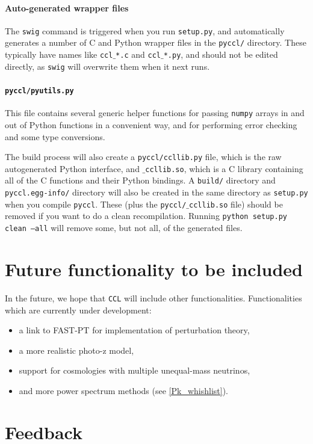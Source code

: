 \documentclass[\docopts]{\docclass}
\begin{document}
\paragraph{Auto-generated wrapper files} The {\tt swig} command is triggered when you run {\tt setup.py}, and automatically generates a number of C and Python wrapper files in the {\tt pyccl/} directory. These typically have names like {\tt ccl$\_$*.c} and {\tt ccl$\_$*.py}, and should not be edited directly, as {\tt swig} will overwrite them when it next runs.

\paragraph{{\tt pyccl/pyutils.py}} This file contains several generic helper functions for passing {\tt numpy} arrays in and out of Python functions in a convenient way, and for performing error checking and some type conversions.

The build process will also create a {\tt pyccl/ccllib.py} file, which is the raw autogenerated Python interface, and {\tt $\_$ccllib.so}, which is a C library containing all of the C functions and their Python bindings. A {\tt build/} directory and {\tt pyccl.egg-info/} directory will also be created in the same directory as {\tt setup.py} when you compile {\tt pyccl}. These (plus the {\tt pyccl/$\_$ccllib.so} file) should be removed if you want to do a clean recompilation. Running {\tt python setup.py clean --all} will remove some, but not all, of the generated files.


\section{Future functionality to be included}
\label{sec:future}

In the future, we hope that {\tt CCL} will include other functionalities. Functionalities which are currently under development:
\begin{itemize}
	\item a link to FAST-PT \citep{FASTPT} for implementation of perturbation theory,
	\item a more realistic photo-z model,
	\item support for cosmologies with multiple unequal-mass neutrinos,
	\item and more power spectrum methods (see \ref{Pk_whishlist}).
\end{itemize}

\section{Feedback}
\label{sec:feedback}
\end{document}
